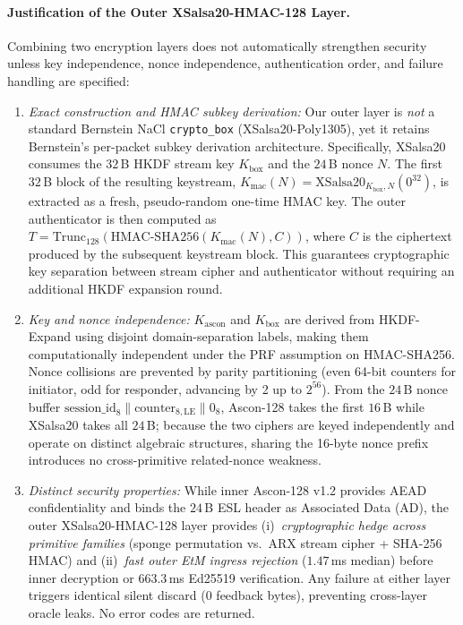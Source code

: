 \documentclass[conference]{IEEEtran}
\begin{document}
\paragraph{Justification of the Outer XSalsa20-HMAC-128 Layer.} Combining two encryption layers does not automatically strengthen security unless key independence, nonce independence, authentication order, and failure handling are specified:
\begin{enumerate}
\setlength{\itemsep}{0pt}\setlength{\parskip}{0pt}
\item \textit{Exact construction and HMAC subkey derivation:} Our outer layer is \emph{not} a standard Bernstein NaCl \texttt{crypto\_box} (XSalsa20-Poly1305), yet it retains Bernstein's per-packet subkey derivation architecture. Specifically, XSalsa20 consumes the $32$\,B HKDF stream key $K_{\text{box}}$ and the $24$\,B nonce $N$. The first $32$\,B block of the resulting keystream, $K_{\text{mac}}(N) = \text{XSalsa20}_{K_{\text{box}}, N}(0^{32})$, is extracted as a fresh, pseudo-random one-time HMAC key. The outer authenticator is then computed as $T = \text{Trunc}_{128}(\text{HMAC-SHA256}(K_{\text{mac}}(N), C))$, where $C$ is the ciphertext produced by the subsequent keystream block. This guarantees cryptographic key separation between stream cipher and authenticator without requiring an additional HKDF expansion round.
\item \textit{Key and nonce independence:} $K_{\text{ascon}}$ and $K_{\text{box}}$ are derived from HKDF-Expand using disjoint domain-separation labels, making them computationally independent under the PRF assumption on HMAC-SHA256. Nonce collisions are prevented by parity partitioning (even 64-bit counters for initiator, odd for responder, advancing by 2 up to $2^{56}$). From the $24$\,B nonce buffer $\text{session\_id}_{8} \parallel \text{counter}_{8,\text{LE}} \parallel 0_{8}$, Ascon-128 takes the first $16$\,B while XSalsa20 takes all $24$\,B; because the two ciphers are keyed independently and operate on distinct algebraic structures, sharing the 16-byte nonce prefix introduces no cross-primitive related-nonce weakness.
\item \textit{Distinct security properties:} While inner Ascon-128 v1.2 provides AEAD confidentiality and binds the $24$\,B ESL header as Associated Data (AD), the outer XSalsa20-HMAC-128 layer provides (i)~\emph{cryptographic hedge across primitive families} (sponge permutation vs.\ ARX stream cipher + SHA-256 HMAC) and (ii)~\emph{fast outer EtM ingress rejection} ($1.47$\,ms median) before inner decryption or $663.3$\,ms Ed25519 verification. Any failure at either layer triggers identical silent discard (0 feedback bytes), preventing cross-layer oracle leaks. No error codes are returned.
\end{enumerate}
\end{document}
